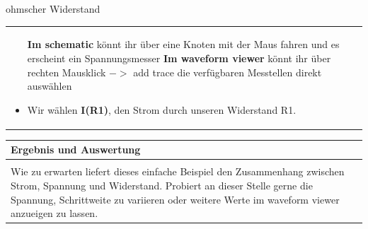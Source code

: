 \begin{frame}[t]{ohmscher Widerstand}
\begin{spacing}{0.9}
\begin{tiny}
\begin{table}[h!]
\begin{tabular}{p{5cm} p{5cm}}
\begin{minipage}{.5\textwidth}
\begin{itemize}
                    \textbf{Im schematic} könnt ihr über eine Knoten mit der Maus fahren und es erscheint ein Spannungsmesser\newline\newline
                    \textbf{Im waveform viewer} könnt ihr über rechten Mausklick $->$ add trace die verfügbaren Messtellen direkt auswählen
              \item Wir wählen \textbf{I(R1)}, den Strom durch unseren Widerstand R1.
            \end{itemize}
          \end{minipage}
          \\
        \end{tabular}
      \end{table}
    \end{tiny} \end{spacing}

  \begin{spacing}{0.9} \begin{tiny}
      \begin{table}[h!]
        \begin{tabular}{p{10cm} }
          \hline
          \textbf{Ergebnis und Auswertung} \\
          \hline                           \\
          Wie zu erwarten liefert dieses einfache Beispiel den Zusammenhang zwischen Strom, Spannung und Widerstand. Probiert an dieser Stelle gerne die Spannung, Schrittweite
          zu variieren oder weitere Werte im waveform viewer anzueigen zu lassen.
        \end{tabular}
      \end{table}
    \end{tiny} \end{spacing}

\end{frame}